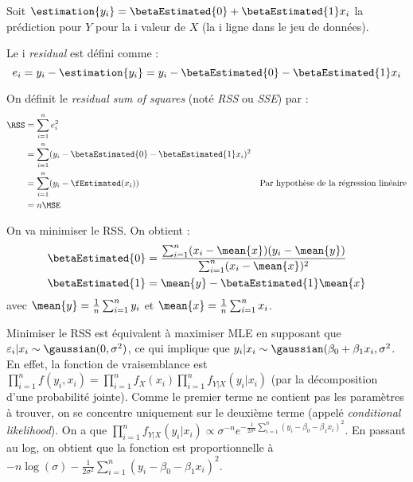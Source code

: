        \begin{definition}
            Soit \(\estimation{y_i} = \betaEstimated{0} + \betaEstimated{1}x_i\) la prédiction pour \(Y\) pour la i\ieme{} valeur de \(X\) (la i\ieme{} ligne dans le jeu de données).

            Le i\ieme{} \textit{residual} est défini comme :
            \[
                e_i = y_i - \estimation{y_i} = y_i - \betaEstimated{0} - \betaEstimated{1} x_i
            \]

            On définit le \textit{residual sum of squares} (noté \textit{RSS} ou \textit{SSE}) par :
            \begin{align*}
                \RSS &= \sum_{i=1}^n e_i^2\\
                &= \sum_{i=1}^n (y_i - \betaEstimated{0} - \betaEstimated{1} x_i)^2\\
                &= \sum_{i=1}^n (y_i - \fEstimated(x_i)) & \text{Par hypothèse de la régression linéaire}\\
                &= n \MSE\index{MSE}
            \end{align*}
        \end{definition}

        On va minimiser le RSS. On obtient :
        \begin{align*}
            \betaEstimated{0} &= \frac{\sum_{i=1}^n (x_i - \mean{x})(y_i - \mean{y})}{\sum_{i=1}^n (x_i - \mean{x})^2}\\
            \betaEstimated{1} &= \mean{y} - \betaEstimated{1}\mean{x}
        \end{align*}
        avec \(\mean{y} = \frac{1}{n}\sum_{i=1}^n y_i\) et \(\mean{x} = \frac{1}{n}\sum_{i=1}^n x_i\).

        \begin{remarque}
            Minimiser le RSS est équivalent à maximiser MLE en supposant que \(\varepsilon_i|x_i \sim  \gaussian(0, \sigma^2)\), ce qui implique que \(y_i|x_i \sim \gaussian(\beta_0 + \beta_1 x_i, \sigma^2\). En effet, la fonction de vraisemblance est \(\prod_{i=1}^n f(y_i, x_i) = \prod_{i=1}^n f_X(x_i) \prod_{i=1}^n f_{Y|X}(y_i|x_i)\) (par la décomposition d'une probabilité jointe). Comme le premier terme ne contient pas les paramètres à trouver, on se concentre uniquement sur le deuxième terme (appelé \textit{conditional likelihood}). On a que \(\prod_{i=1}^n f_{Y|X}(y_i|x_i) \propto \sigma^{-n}e^{-\frac{1}{2\sigma^2}\sum_{i=1}^n (y_i - \beta_0 - \beta_1x_i)^2}\). En passant au log, on obtient que la fonction est proportionnelle à \(-n\log(\sigma) - \frac{1}{2\sigma^2}\sum_{i=1}^n (y_i - \beta_0 - \beta_1x_i)^2\).
        \end{remarque}

